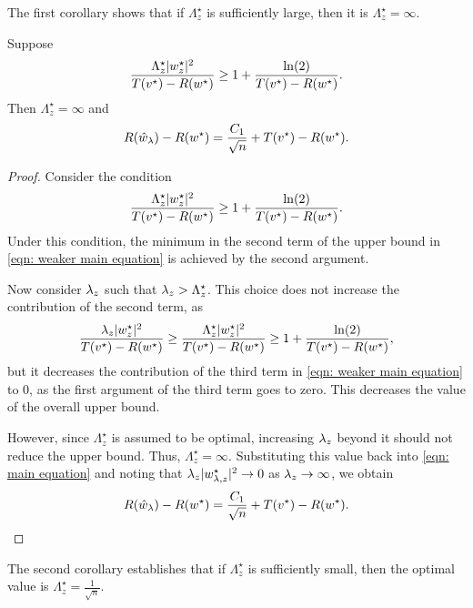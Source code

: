 The first corollary shows that if $\Lambda_z^\star$ is sufficiently large, then it is $\Lambda_z^\star = \infty$.

\begin{corollary}\label{cor: consequence of main theorem 1}
Suppose
\begin{equation*}
    \frac{\Lambda_z^\star|w^\star_z|^2}{T(v^\star) - R(w^\star)} \geq 1+\frac{\ln(2)}{T(v^\star) - R(w^\star)}.
\end{equation*}
Then $\Lambda_z^\star = \infty$ and
    \begin{equation*}
        R(\hat{w}_\lambda) - R(w^\star) = \frac{C_1}{\sqrt{n}} + T(v^\star) - R(w^\star).
    \end{equation*}
\end{corollary}

\begin{proof}
Consider the condition
\begin{equation*}
    \frac{\Lambda_z^\star |w^\star_z|^2}{T(v^\star) - R(w^\star)} \geq 1 + \frac{\ln(2)}{T(v^\star) - R(w^\star)}.
\end{equation*}
Under this condition, the minimum in the second term of the upper bound in \eqref{eqn: weaker main equation} is achieved by the second argument.

Now consider $\lambda_z$ such that $\lambda_z > \Lambda_z^\star$. This choice does not increase the contribution of the second term, as
\begin{equation*}
    \frac{\lambda_z |w^\star_z|^2}{T(v^\star) - R(w^\star)} \geq \frac{\Lambda_z^\star |w^\star_z|^2}{T(v^\star) - R(w^\star)} \geq 1 + \frac{\ln(2)}{T(v^\star) - R(w^\star)},
\end{equation*}
but it decreases the contribution of the third term in \eqref{eqn: weaker main equation} to $0$, as the first argument of the third term goes to zero. This decreases the value of the overall upper bound.

However, since $\Lambda_z^\star$ is assumed to be optimal, increasing $\lambda_z$ beyond it should not reduce the upper bound. Thus, $\Lambda_z^\star = \infty$. Substituting this value back into \eqref{eqn: main equation} and noting that $\lambda_z |w^\star_{{\lambda,z}}|^2 \to 0$ as $\lambda_z \to \infty$, we obtain
    \begin{equation*}
        R(\hat{w}_\lambda) - R(w^\star) = \frac{C_1}{\sqrt{n}} + T(v^\star) - R(w^\star).
    \end{equation*}
\end{proof}

The second corollary establishes that if $\Lambda_z^\star$ is sufficiently small, then the optimal value is $\Lambda_z^\star = \frac{1}{\sqrt{n}}$.

